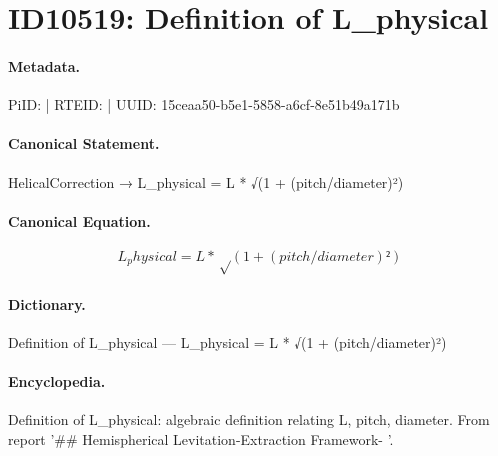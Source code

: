 \section*{ID10519: Definition of L\_physical}
\paragraph{Metadata.}
PiID:  | RTEID:  | UUID: 15ceaa50-b5e1-5858-a6cf-8e51b49a171b

\paragraph{Canonical Statement.}
HelicalCorrection → L\_physical = L * √(1 + (pitch/diameter)²)

\paragraph{Canonical Equation.}
\[
L_physical = L * √(1 + (pitch/diameter)²)
\]

\paragraph{Dictionary.}
Definition of L\_physical — L\_physical = L * √(1 + (pitch/diameter)²)

\paragraph{Encyclopedia.}
Definition of L\_physical: algebraic definition relating L, pitch, diameter. From report '\#\# Hemispherical Levitation-Extraction Framework- '.
